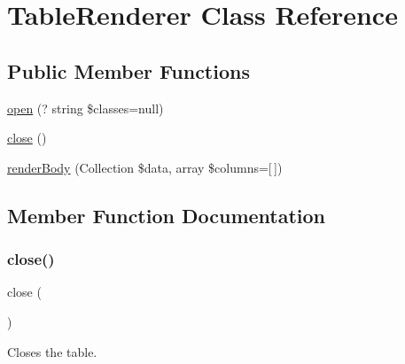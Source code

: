 \hypertarget{classhamburgscleanest_1_1_data_tables_1_1_helpers_1_1_table_renderer}{}\section{Table\+Renderer Class Reference}
\label{classhamburgscleanest_1_1_data_tables_1_1_helpers_1_1_table_renderer}
\subsection*{Public Member Functions}
\begin{DoxyCompactItemize}
\item 
\hyperlink{classhamburgscleanest_1_1_data_tables_1_1_helpers_1_1_table_renderer_aa1cd2b57142fd65141dfcbc7d1a75e98}{open} (? string \$classes=null)
\item 
\hyperlink{classhamburgscleanest_1_1_data_tables_1_1_helpers_1_1_table_renderer_aa69c8bf1f1dcf4e72552efff1fe3e87e}{close} ()
\item 
\hyperlink{classhamburgscleanest_1_1_data_tables_1_1_helpers_1_1_table_renderer_aa0a7cfbdfa3c15180c8e49f27aaac681}{render\+Body} (Collection \$data, array \$columns=\mbox{[}$\,$\mbox{]})
\end{DoxyCompactItemize}


\subsection{Member Function Documentation}
\mbox{\label{classhamburgscleanest_1_1_data_tables_1_1_helpers_1_1_table_renderer_aa69c8bf1f1dcf4e72552efff1fe3e87e}} 
\subsubsection{\texorpdfstring{close()}{close()}}
{\footnotesize\ttfamily close (\begin{DoxyParamCaption}{ }\end{DoxyParamCaption})}

Closes the table.

